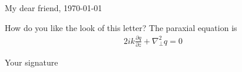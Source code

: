 \documentclass[17pt]{extarticle}
\begin{document}
\Fontskrivan

\begin{tornpage}
\noindent My dear friend, \hfill \today

How do you like the look of this letter? The paraxial equation is 
\begin{align}
2ik\frac{\partial q}{\partial z} + \nabla_\perp^2 q = 0
\end{align}
\lipsum[1]

\hfill Your signature
\end{tornpage}
\end{document}
